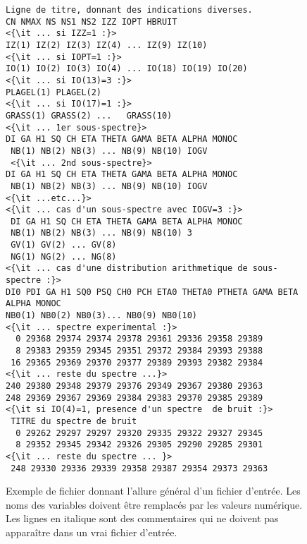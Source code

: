 \begin{figure}
\caption{\label{fig:format_fichier} 
Exemple de fichier donnant l'allure général d'un fichier d'entrée.
Les noms des variables doivent être remplacés par les valeurs numérique.
Les lignes en italique sont des commentaires qui ne doivent pas appara\^itre dans un vrai fichier d'entrée.}
\begin{lstlisting}[frame=tbl,escapeinside=<>]
Ligne de titre, donnant des indications diverses.
CN NMAX NS NS1 NS2 IZZ IOPT HBRUIT
<{\it ... si IZZ=1 :}>
IZ(1) IZ(2) IZ(3) IZ(4) ... IZ(9) IZ(10)
<{\it ... si IOPT=1 :}>
IO(1) IO(2) IO(3) IO(4) ... IO(18) IO(19) IO(20)
<{\it ... si IO(13)=3 :}>
PLAGEL(1) PLAGEL(2)
<{\it ... si IO(17)=1 :}>
GRASS(1) GRASS(2) ...   GRASS(10) 
<{\it ... 1er sous-spectre}>
DI GA H1 SQ CH ETA THETA GAMA BETA ALPHA MONOC
 NB(1) NB(2) NB(3) ... NB(9) NB(10) IOGV
 <{\it ... 2nd sous-spectre}>
DI GA H1 SQ CH ETA THETA GAMA BETA ALPHA MONOC   
 NB(1) NB(2) NB(3) ... NB(9) NB(10) IOGV
<{\it ...etc...}>
<{\it ... cas d'un sous-spectre avec IOGV=3 :}>
 DI GA H1 SQ CH ETA THETA GAMA BETA ALPHA MONOC
 NB(1) NB(2) NB(3) ... NB(9) NB(10) 3
 GV(1) GV(2) ... GV(8)
 NG(1) NG(2) ... NG(8)
<{\it ... cas d'une distribution arithmetique de sous-spectre :}>
DI0 PDI GA H1 SQ0 PSQ CH0 PCH ETA0 THETA0 PTHETA GAMA BETA ALPHA MONOC
NB0(1) NB0(2) NB0(3)... NB0(9) NB0(10)
<{\it ... spectre experimental :}>
  0 29368 29374 29374 29378 29361 29336 29358 29389
  8 29383 29359 29345 29351 29372 29384 29393 29388
 16 29365 29369 29370 29377 29389 29393 29382 29384
<{\it ... reste du spectre ...}>
240 29380 29348 29379 29376 29349 29367 29380 29363
248 29369 29367 29369 29384 29383 29370 29385 29389
<{\it si IO(4)=1, presence d'un spectre  de bruit :}>
 TITRE du spectre de bruit
  0 29262 29297 29297 29320 29335 29322 29327 29345
  8 29352 29345 29342 29326 29305 29290 29285 29301
<{\it ... reste du spectre ... }>
 248 29330 29336 29339 29358 29387 29354 29373 29363
 \end{lstlisting}
\end{figure}

\FloatBarrier
\newpage

